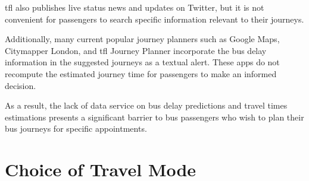 \par \acrshort{tfl} also publishes live status news and updates on Twitter\cite{tfl_bus_alerts_twitter}, but it is not convenient for passengers to search specific information relevant to their journeys.

\par Additionally, many current popular journey planners such as Google Maps\cite{google_maps}, Citymapper London\cite{citymapper}, and \acrshort{tfl} Journey Planner incorporate the bus delay information in the suggested journeys as a textual alert. These apps do not recompute the estimated journey time for passengers to make an informed decision.

\par As a result, the lack of data service on bus delay predictions and travel times estimations presents a significant barrier to bus passengers who wish to plan their bus journeys for specific appointments.

\section{Choice of Travel Mode}
